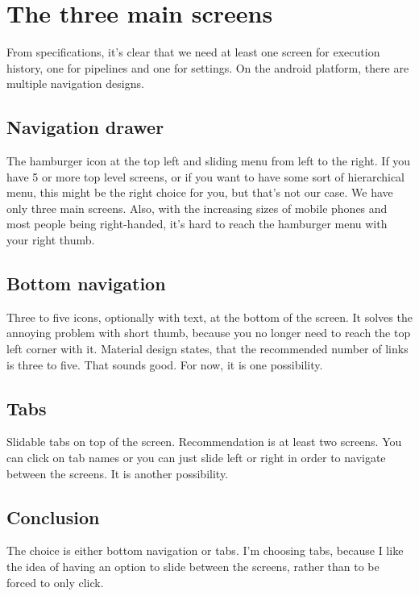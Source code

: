\section{The three main screens}
From specifications, it's clear that we need at least one screen for execution history, one for pipelines and one for settings.
On the android platform, there are multiple navigation designs.

\subsection{Navigation drawer}
The hamburger icon at the top left and sliding menu from left to the right.
If you have 5 or more top level screens, or if you want to have some sort of hierarchical menu, this might be the right choice for you, but that's not our case. We have only three main screens.
Also, with the increasing sizes of mobile phones and most people being right-handed, it's hard to reach the hamburger menu with your right thumb.

\subsection{Bottom navigation}
Three to five icons, optionally with text, at the bottom of the screen.
It solves the annoying problem with short thumb, because you no longer need to reach the top left corner with it.
Material design states, that the recommended number of links is three to five. That sounds good.
For now, it is one possibility.

\subsection{Tabs}
Slidable tabs on top of the screen.
Recommendation is at least two screens.
You can click on tab names or you can just slide left or right in order to navigate between the screens.
It is another possibility.

\subsection{Conclusion}
The choice is either bottom navigation or tabs.
I'm choosing tabs, because I like the idea of having an option to slide between the screens, rather than to be forced to only click.


